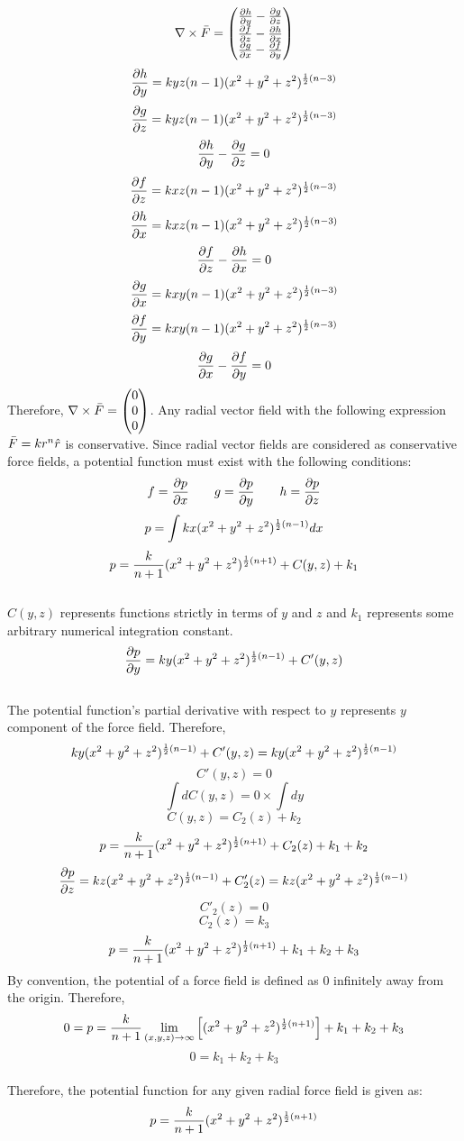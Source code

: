 \documentclass[a4paper, 12pt]{report}
\begin{document}
\begin{center}
\renewcommand\arraystretch{1.5}
$$\nabla \times \bar{F} = \begin{pmatrix} \frac{\partial h}{\partial y} - \frac{\partial g}{\partial z} \\ \frac{\partial f}{\partial z} - \frac{\partial h}{\partial x} \\ \frac{\partial g}{\partial x} - \frac{\partial f}{\partial y}\end{pmatrix}$$
\renewcommand\arraystretch{1.0}
$$\frac{\partial h}{\partial y} = kyz(n - 1)(x^2 + y^2 + z^2)^{\frac{1}{2}(n-3)}$$
$$\frac{\partial g}{\partial z} = kyz(n - 1)(x^2 + y^2 + z^2)^{\frac{1}{2}(n-3)}$$
$$\frac{\partial h}{\partial y} - \frac{\partial g}{\partial z} = 0$$
$$\frac{\partial f}{\partial z} = kxz(n - 1)(x^2 + y^2 + z^2)^{\frac{1}{2}(n-3)}$$
$$\frac{\partial h}{\partial x} = kxz(n - 1)(x^2 + y^2 + z^2)^{\frac{1}{2}(n-3)}$$
$$\frac{\partial f}{\partial z} - \frac{\partial h}{\partial x} = 0$$
$$\frac{\partial g}{\partial x} = kxy(n - 1)(x^2 + y^2 + z^2)^{\frac{1}{2}(n-3)}$$
$$\frac{\partial f}{\partial y} = kxy(n - 1)(x^2 + y^2 + z^2)^{\frac{1}{2}(n-3)}$$
$$\frac{\partial g}{\partial x} - \frac{\partial f}{\partial y} = 0$$
Therefore, $\displaystyle{\nabla\times \bar{F} = \begin{pmatrix}0\\0\\0 \end{pmatrix}}$. Any radial vector field with the following expression $\bar{F} = kr^n\hat{r}$ is conservative. Since radial vector fields are considered as conservative force fields, a potential function must exist with the following conditions: 
$$f = \frac{\partial p}{\partial x}\qquad g = \frac{\partial p}{\partial y}\qquad h = \frac{\partial p}{\partial z}$$
$$p = \int  kx(x^2 + y^2 + z^2)^{\frac{1}{2}(n-1)} dx$$
$$p = \frac{k}{n+1}(x^2+y^2+z^2)^{\frac{1}{2}(n+1)} + C(y,z) + k_1$$
\\$C(y,z)$ represents functions strictly in terms of $y$ and $z$ and $k_1$ represents some arbitrary numerical integration constant.
$$\frac{\partial p}{\partial y} = ky(x^2 + y^2 + z^2)^{\frac{1}{2}(n-1)} + C'(y,z)$$
\\The potential function's partial derivative with respect to $y$ represents $y$ component of the force field. Therefore,
$$ky(x^2 + y^2 + z^2)^{\frac{1}{2}(n-1)} + C'(y,z) = ky(x^2 + y^2 + z^2)^{\frac{1}{2}(n-1)}$$
$$C'(y,z) = 0$$
$$\int dC(y,z) = 0\times\int dy$$
$$C(y,z) = C_2(z) + k_2$$
$$p = \frac{k}{n+1}(x^2+y^2+z^2)^{\frac{1}{2}(n+1)} + C_2(z) + k_1 + k_2$$
$$\frac{\partial p}{\partial z} = kz(x^2 + y^2 + z^2)^{\frac{1}{2}(n-1)} + C_2'(z) = kz(x^2 + y^2 + z^2)^{\frac{1}{2}(n-1)}$$
$$C'_2(z) = 0$$
$$C_2(z) = k_3$$
$$p = \frac{k}{n+1}(x^2+y^2+z^2)^{\frac{1}{2}(n+1)} + k_1 + k_2 + k_3$$
By convention, the potential of a force field is defined as 0 infinitely away from the origin. Therefore, 
$$0 =p = \frac{k}{n + 1}\lim_{(x,y,z)\to\infty} \left[(x^2+y^2+z^2)^{\frac{1}{2}(n+1)}\right] + k_1 + k_2 + k_3$$
$$0 = k_1 + k_2 + k_3$$
\\Therefore, the potential function for any given radial force field is given as:
$$p = \frac{k}{n+1}(x^2+y^2+z^2)^{\frac{1}{2}(n+1)} $$
\end{center}
\end{document}
